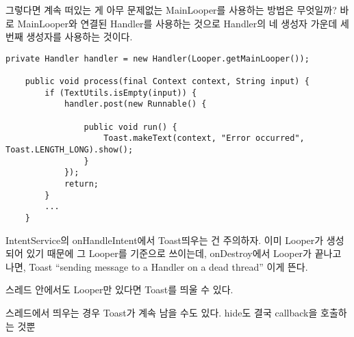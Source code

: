 그렇다면 계속 떠있는 게 아무 문제없는 MainLooper를 사용하는 방법은 무엇일까? 바로 MainLooper와 연결된 Handler를 사용하는 것으로 Handler의 네 생성자 가운데 세 번째 생성자를 사용하는 것이다.
\begin{lstlisting}[frame=single] 
	private Handler handler = new Handler(Looper.getMainLooper());
	
	public void process(final Context context, String input) {
		if (TextUtils.isEmpty(input)) {
			handler.post(new Runnable() {
				
				public void run() {
					Toast.makeText(context, "Error occurred", Toast.LENGTH_LONG).show();
				}
			});
			return;
		}
		...
	}
\end{lstlisting}

IntentService의 onHandleIntent에서 Toast띄우는 건 주의하자. 이미 Looper가 생성되어 있기 때문에 그 Looper를 기준으로 쓰이는데, onDestroy에서 Looper가 끝나고 나면, Toast “sending message to a Handler on a dead thread” 이게 뜬다.

스레드 안에서도 Looper만 있다면 Toast를 띄울 수 있다.

스레드에서 띄우는 경우 Toast가 계속 남을 수도 있다. hide도 결국 callback을 호출하는 것뿐

